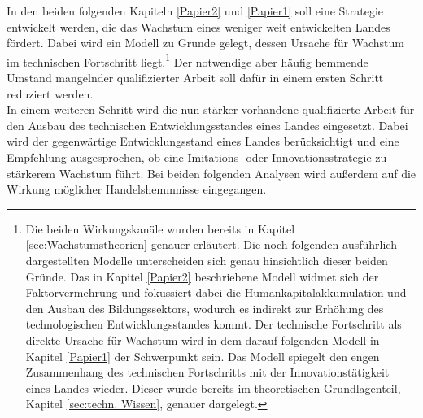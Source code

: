 %
In den beiden folgenden Kapiteln \ref{Papier2} und \ref{Papier1} soll eine Strategie entwickelt werden, die das Wachstum eines weniger weit entwickelten Landes fördert. Dabei wird ein Modell zu Grunde gelegt, dessen Ursache für Wachstum im technischen Fortschritt liegt.\footnote{Die beiden Wirkungskanäle wurden bereits in Kapitel \ref{sec:Wachstumstheorien} genauer erläutert. Die noch folgenden ausführlich dargestellten Modelle unterscheiden sich genau hinsichtlich dieser beiden Gründe. Das in Kapitel \ref{Papier2} beschriebene Modell widmet sich der Faktorvermehrung und fokussiert dabei die Humankapitalakkumulation und den Ausbau des Bildungssektors, wodurch es indirekt zur Erhöhung des technologischen Entwicklungsstandes kommt. Der technische Fortschritt als direkte Ursache für Wachstum wird in dem darauf folgenden Modell in Kapitel \ref{Papier1} der Schwerpunkt sein. Das Modell spiegelt den engen Zusammenhang des technischen Fortschritts mit der Innovationstätigkeit eines Landes wieder. Dieser wurde bereits im theoretischen Grundlagenteil, Kapitel \ref{sec:techn. Wissen}, genauer dargelegt.} Der notwendige aber häufig hemmende Umstand mangelnder qualifizierter Arbeit soll dafür in einem ersten Schritt reduziert werden. \\
%
In einem weiteren Schritt wird die nun stärker vorhandene qualifizierte Arbeit für den Ausbau des technischen Entwicklungsstandes eines Landes eingesetzt. Dabei wird der gegenwärtige Entwicklungsstand eines Landes berücksichtigt und eine Empfehlung ausgesprochen, ob eine Imitations- oder Innovationsstrategie zu stärkerem Wachstum führt. Bei beiden folgenden Analysen wird außerdem auf die Wirkung möglicher Handelshemmnisse eingegangen.
